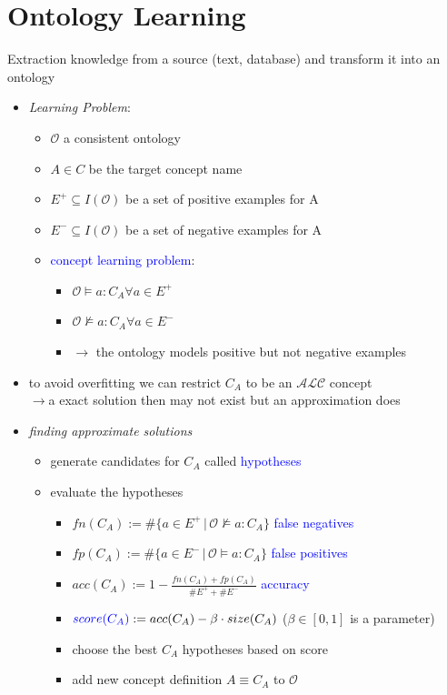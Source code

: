\documentclass[12pt,a4paper]{article}
\newcommand{\blue}[1]{\textcolor{blue} {#1}}
\newcommand{\ont}{\mathcal{O}}
\begin{document}
\section{Ontology Learning}
Extraction knowledge from a source (text, database) and transform it into an ontology
\begin{itemize}
\item \textit{Learning Problem}:
\begin{itemize}
\item $\ont$ a consistent ontology
\item $A\in C$ be the target concept name
\item $E^+ \subseteq I(\ont)$ be a set of positive examples for A
\item $E^- \subseteq I(\ont)$ be a set of negative examples for A
\item \blue{concept learning problem}:
\begin{itemize}
\item $\ont \models a:C_A \forall a\in E^+$
\item $\ont \not\models a:C_A \forall a\in E^-$
\item $\rightarrow$ the ontology models positive but not negative examples
\end{itemize}
\end{itemize}
\item to avoid overfitting we can restrict $C_A$ to be an $\mathcal{ALC}$ concept\\$\rightarrow$a exact solution then may not exist but an approximation does
\item \textit{finding approximate solutions}
\begin{itemize}
\item generate candidates for $C_A$ called \blue{hypotheses}
\item evaluate the hypotheses
\begin{itemize}
\item $fn(C_A) := \# \{a\in E^+ \,|\, \ont \not\models a:C_A\}$ \blue{false negatives}
\item $fp(C_A) := \# \{a\in E^- \,|\, \ont \models a:C_A\}$ \blue{false positives}
\item $\displaystyle acc(C_A) := 1-\frac{fn(C_A)+fp(C_A)}{\#E^+ + \# E^-}$ \blue{accuracy}
\item $\blue{score(C_A)} := acc(C_A) - \beta\cdot size(C_A)$ \quad ($\beta \in [0,1]$ is a parameter)
\item choose the best $C_A$ hypotheses based on score
\item add new concept definition $A\equiv C_A$ to $\ont$

\end{itemize}
\end{itemize}
\end{itemize}
\end{document}
